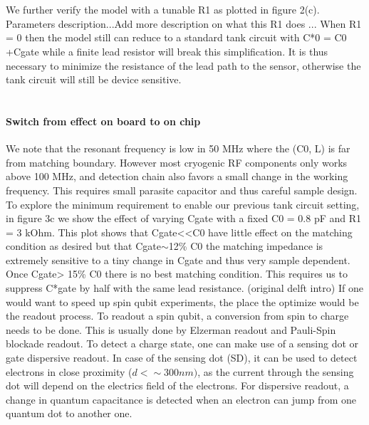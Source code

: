 \documentclass{article}
\begin{document}
	\\ \\
	We further verify the model with a tunable R1 as plotted in figure 2(c). Parameters description...Add more description on what this R1 does ... When R1 = 0 then the model still can reduce to a standard tank circuit with C*0 = C0 +Cgate while a finite lead resistor will break this simplification. It is thus necessary to minimize the resistance of the lead path to the sensor, otherwise the tank circuit will still be device sensitive. 
	\\ \\
	\paragraph{Switch from effect on board to on chip } %
	\label{par:switch_from_effect_on_board_to_on_chip_}
	We note that the resonant frequency is low in 50 MHz where the (C0, L) is far from matching boundary. However most cryogenic RF components only works above 100 MHz, and detection chain also favors a small change in the working frequency. This requires small parasite capacitor and thus careful sample design. To explore the minimum requirement to enable our previous tank circuit setting, in figure 3c we show the effect of varying Cgate with a fixed C0 = 0.8 pF and R1 = 3 kOhm.  This plot shows that Cgate<<C0 have little effect on the matching condition as desired but that Cgate$\sim$12\% C0 the matching impedance is extremely sensitive to a tiny change in Cgate and thus very sample dependent. Once Cgate> 15\% C0 there is no best matching condition.  This requires us to suppress C*gate by half with the same lead resistance.
\color{gray} (original delft intro)
	If one would want to speed up spin qubit experiments, the place the optimize would be the readout process. To readout a spin qubit, a conversion from spin to charge needs to be done. This is usually done by Elzerman readout and Pauli-Spin blockade readout. To detect a charge state, one can make use of a sensing dot or gate dispersive readout. In case of the sensing dot (SD), it can be used to detect electrons in close proximity ($d < \sim  300nm)$, as the current through the sensing dot will depend on the electrics field  of the electrons. For dispersive readout, a change in quantum capacitance is detected when an electron can jump from one quantum dot to another one.\\
\end{document}
